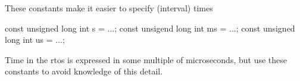These constants make it easier to specify (interval) times


\begin{DoxyCode}
\textcolor{keyword}{const} \textcolor{keywordtype}{unsigned} \textcolor{keywordtype}{long} \textcolor{keywordtype}{int}  s = ...;
\textcolor{keyword}{const} unsigend \textcolor{keywordtype}{long} \textcolor{keywordtype}{int} ms = ...;
\textcolor{keyword}{const} \textcolor{keywordtype}{unsigned} \textcolor{keywordtype}{long} \textcolor{keywordtype}{int} us = ...;
\end{DoxyCode}


Time in the rtos is expressed in some multiple of microseconds, but use these constants to avoid knowledge of this detail. 